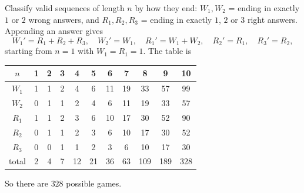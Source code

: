 Classify valid sequences of length $n$ by how they end: $W_1,W_2$ = ending in exactly $1$ or $2$ wrong answers, and $R_1,R_2,R_3$ = ending in exactly $1$, $2$ or $3$ right answers. Appending an answer gives
\[W_1'=R_1+R_2+R_3,\quad W_2'=W_1,\quad R_1'=W_1+W_2,\quad R_2'=R_1,\quad R_3'=R_2,\]
starting from $n=1$ with $W_1=R_1=1$. The table is
\begin{center}
\begin{tabular}{c|cccccccccc}
$n$ & 1&2&3&4&5&6&7&8&9&10\\ \hline
$W_1$ & 1&1&2&4&6&11&19&33&57&99\\
$W_2$ & 0&1&1&2&4&6&11&19&33&57\\
$R_1$ & 1&1&2&3&6&10&17&30&52&90\\
$R_2$ & 0&1&1&2&3&6&10&17&30&52\\
$R_3$ & 0&0&1&1&2&3&6&10&17&30\\ \hline
total & 2&4&7&12&21&36&63&109&189&328
\end{tabular}
\end{center}
So there are $\boxed{328}$ possible games.
